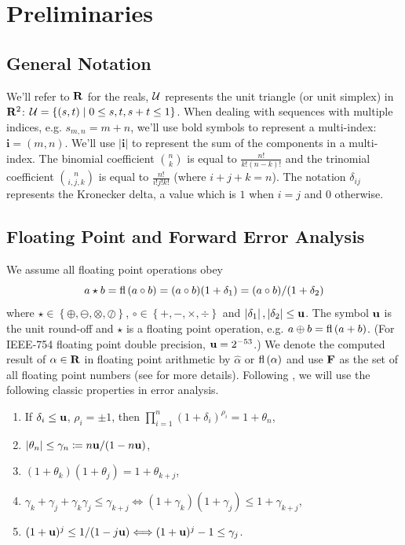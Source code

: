 \chapter{Preliminaries}\label{chap:preliminaries}

\section{General Notation}

We'll refer to \(\mathbf{R}\) for the reals, \(\mathcal{U}\) represents
the unit triangle (or unit simplex) in \(\mathbf{R}^2\):
\(\mathcal{U} = \left\{(s, t) \mid 0 \leq s, t, s + t \leq 1\right\}\).
When dealing with sequences with multiple indices, e.g.
\(s_{m, n} = m + n\), we'll use bold symbols to represent
a multi-index: \(\bm{i} = (m, n)\). We'll use \(\left|\bm{i}\right|\) to
represent the sum of the components in a multi-index.
The binomial coefficient
\(\binom{n}{k}\) is equal to \(\frac{n!}{k! (n - k)!}\) and the trinomial
coefficient \(\binom{n}{i, j, k}\) is equal to \(\frac{n!}{i! j! k!}\)
(where \(i + j + k = n\)). The notation \(\delta_{ij}\) represents the
Kronecker delta, a value which is \(1\) when \(i = j\) and \(0\)
otherwise.

\section{Floating Point and Forward Error Analysis}

We assume all floating point operations obey
\begin{equation}
  a \star b = \operatorname{fl}\left(a \circ b\right) = (a \circ b)(1 + \delta_1) =
  (a \circ b) / (1 + \delta_2)
\end{equation}
where \(\star \in \left\{\oplus, \ominus, \otimes, \oslash\right\}\), \(\circ
\in \left\{+, -, \times, \div\right\}\) and \(\left|\delta_1\right|,
\left|\delta_2\right| \leq \mathbf{u}\). The symbol \(\mathbf{u}\) is the unit round-off
and \(\star\) is a floating point operation, e.g.
\(a \oplus b = \operatorname{fl}\left(a + b\right)\). (For IEEE-754 floating point double precision,
\(\mathbf{u} = 2^{-53}\).) We denote the computed result of
\(\alpha \in \mathbf{R}\) in floating point arithmetic by
\(\widehat{\alpha}\) or \(\operatorname{fl}\left(\alpha\right)\) and use \(\mathbf{F}\) as the set of
all floating point numbers (see \cite{Higham2002} for more details).
Following \cite{Higham2002}, we will use the following classic properties in
error analysis.

\begin{enumerate}
  \item If \(\delta_i \leq \mathbf{u}\), \(\rho_i = \pm 1\), then
      \(\prod_{i = 1}^n (1 + \delta_i)^{\rho_i} = 1 + \theta_n\),
  \item \(\left|\theta_n\right| \leq \gamma_n \coloneqq
      n \mathbf{u} / (1 - n \mathbf{u})\),
  \item \((1 + \theta_k)(1 + \theta_j) = 1 + \theta_{k + j}\),
  \item \(\gamma_k + \gamma_j + \gamma_k \gamma_j \leq \gamma_{k + j}
    \Longleftrightarrow (1 + \gamma_k)(1 + \gamma_j) \leq 1 + \gamma_{k + j}\),
  \item \((1 + \mathbf{u})^j \leq 1 / (1 - j \mathbf{u}) \Longleftrightarrow
  (1 + \mathbf{u})^j - 1 \leq \gamma_j\).
\end{enumerate}

